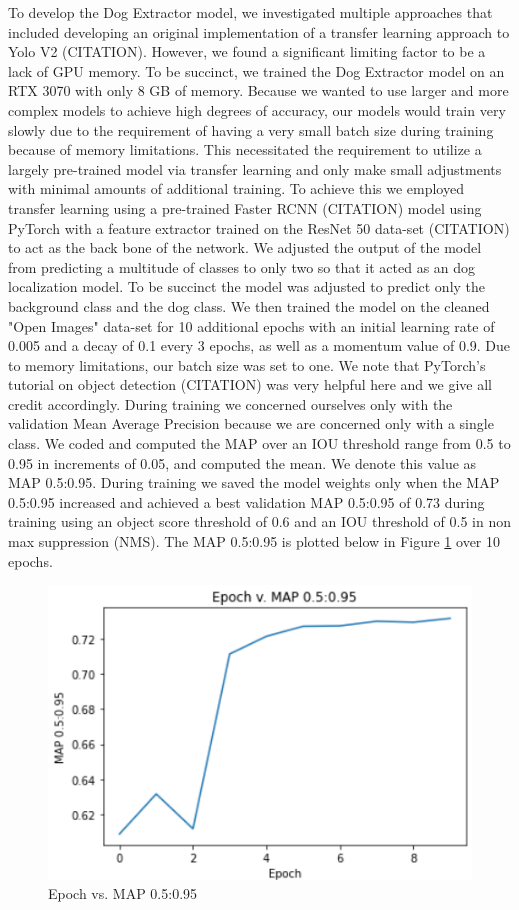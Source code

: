 \documentclass{article}
\begin{document}
To develop the Dog Extractor model, we investigated multiple approaches that included developing an original implementation of a transfer learning approach to Yolo V2 (CITATION).  However, we found a significant limiting factor to be a lack of GPU memory.  To be succinct, we trained the Dog Extractor model on an RTX 3070 with only 8 GB of memory.  Because we wanted to use larger and more complex models to achieve high degrees of accuracy, our models would train very slowly due to the requirement of having a very small batch size during training because of memory limitations.  This necessitated the requirement to utilize a largely pre-trained model via transfer learning and only make small adjustments with minimal amounts of additional training.  To achieve this we employed transfer learning using a pre-trained Faster RCNN (CITATION) model using PyTorch with a feature extractor trained on the ResNet 50 data-set (CITATION) to act as the back bone of the network.  We adjusted the output of the model from predicting a multitude of classes to only two so that it acted as an dog localization model.  To be succinct the model was adjusted to predict only the background class and the dog class.  We then trained the model on the cleaned "Open Images" data-set for 10 additional epochs with an initial learning rate of 0.005 and a decay of 0.1 every 3 epochs, as well as a momentum value of 0.9.  Due to memory limitations, our batch size was set to one.  We note that PyTorch's tutorial on object detection (CITATION) was very helpful here and we give all credit accordingly.  During training we concerned ourselves only with the validation Mean Average Precision because we are concerned only with a single class.  We coded and computed the MAP over an IOU threshold range from 0.5 to 0.95 in increments of 0.05, and computed the mean.  We denote this value as MAP 0.5:0.95.  During training we saved the model weights only when the MAP 0.5:0.95 increased and achieved a best validation MAP 0.5:0.95 of 0.73 during training using an object score threshold of 0.6 and an IOU threshold of 0.5 in non max suppression (NMS).  The MAP 0.5:0.95 is plotted below in Figure \ref{fig:x epoch_v_map} over 10 epochs. 

\begin{figure}[h]
\centering
	\includegraphics[scale=0.7]{final-report-images/epoch_v_map.png}
\caption{Epoch vs. MAP 0.5:0.95}
\label{fig:x epoch_v_map}
\end{figure}
\end{document}
